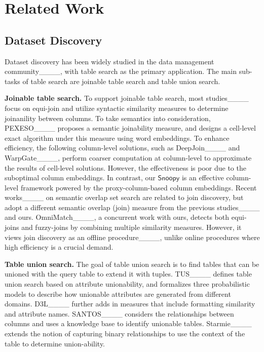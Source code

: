 \section{Related Work}
\label{sec:relatedwork}
\subsection{Dataset Discovery} 
Dataset discovery has been widely studied in the data management community____, with table search  as the primary application. 
The main sub-tasks of table search are joinable table search and table union search.

\textbf{Joinable table search.}
To support joinable table search, most studies____ focus on equi-join and utilize syntactic similarity measures to determine joinanility between columns. 
To take semantics into consideration, PEXESO____ proposes a semantic joinability measure, and designs a cell-level exact algorithm under this measure using word embeddings. To enhance efficiency, the following column-level solutions, such as DeepJoin____ and WarpGate____, perform coarser computation at column-level to approximate the results of cell-level solutions. However, the effectiveness is poor due to the suboptimal column embeddings. In contrast, our $\textsf{Snoopy}$ is an effective column-level framework powered by the proxy-column-based column embeddings.
Recent works____ on semantic overlap set search are related to join discovery, but adopt a different semantic overlap (join) measure from the previous studies____ and ours. 
OmniMatch____, a concurrent work with ours, detects both equi-joins and fuzzy-joins by combining multiple similarity measures. However, it views join discovery as an offline procedure____, unlike online procedures where high efficiency is a crucial demand.


\textbf{Table union search.} The goal of table union search is to find tables that can be unioned with the query table to extend it with tuples. TUS____ defines table union search based on attribute unionability, and formalizes three probabilistic models to describe how unionable attributes are
generated from different domains.
D3L____ further adds in measures that include formatting similarity and attribute names. SANTOS____
considers the relationships between columns and uses a knowledge base to identify  unionable tables. Starmie____ extends the notion of capturing binary relationships to use the context of the table to determine union-ability. 
 
